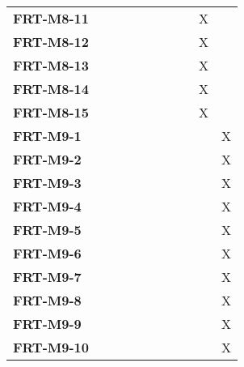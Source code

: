 \documentclass[12pt, titlepage]{article}
\begin{document}
\begin{longtable}{|l|ccccccc|}
	\textbf{FRT-M8-11} & ~                                        & ~           & ~           & ~           & ~           & X           & ~           \\
	\textbf{FRT-M8-12} & ~                                        & ~           & ~           & ~           & ~           & X           & ~           \\
	\textbf{FRT-M8-13} & ~                                        & ~           & ~           & ~           & ~           & X           & ~           \\
	\textbf{FRT-M8-14} & ~                                        & ~           & ~           & ~           & ~           & X           & ~           \\
	\textbf{FRT-M8-15} & ~                                        & ~           & ~           & ~           & ~           & X           & ~           \\
	\textbf{FRT-M9-1}  & ~                                        & ~           & ~           & ~           & ~           & ~           & X           \\
	\textbf{FRT-M9-2}  & ~                                        & ~           & ~           & ~           & ~           & ~           & X           \\
	\textbf{FRT-M9-3}  & ~                                        & ~           & ~           & ~           & ~           & ~           & X           \\
	\textbf{FRT-M9-4}  & ~                                        & ~           & ~           & ~           & ~           & ~           & X           \\
	\textbf{FRT-M9-5}  & ~                                        & ~           & ~           & ~           & ~           & ~           & X           \\
	\textbf{FRT-M9-6}  & ~                                        & ~           & ~           & ~           & ~           & ~           & X           \\
	\textbf{FRT-M9-7}  & ~                                        & ~           & ~           & ~           & ~           & ~           & X           \\
	\textbf{FRT-M9-8}  & ~                                        & ~           & ~           & ~           & ~           & ~           & X           \\
	\textbf{FRT-M9-9}  & ~                                        & ~           & ~           & ~           & ~           & ~           & X           \\
	\textbf{FRT-M9-10} & ~                                        & ~           & ~           & ~           & ~           & ~           & X           \\
	\hline
\end{longtable}
\end{document}

